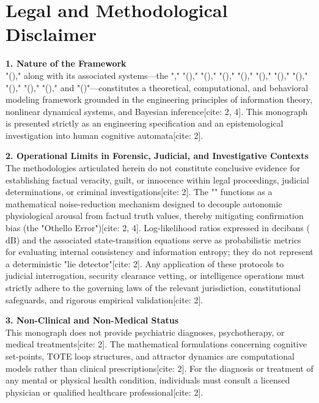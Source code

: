 \else
    \chapter*{Legal and Methodological Disclaimer}
    \noindent
    \textbf{1. Nature of the Framework}\\
    "\fullSNLP (\abbrSNLP)," along with its associated systems—the "\fullOthelloFilter," "\fullOIP (\abbrOIP)," "\fullBTP (\abbrBTP)," "\fullBV (\abbrBV)," "\fullBDLL (\abbrBDLL)," "\fullSBFT (\abbrSBFT)," "\fullTRPSH (\abbrTRPSH)," "\fullBHPPP (\abbrBHPPP)," "\fullUUSTT (\abbrUUSTT)," "\fullRCSMIT (\abbrRCSMIT)," "\fullFTHBFT (\abbrFTHBFT)," and "\fullMBCR (\abbrMBCR)"—constitutes a theoretical, computational, and behavioral modeling framework grounded in the engineering principles of information theory, nonlinear dynamical systems, and Bayesian inference[cite: 2, 4]. This monograph is presented strictly as an engineering specification and an epistemological investigation into human cognitive automata[cite: 2].

    \vspace{0.8em}
    \noindent
    \textbf{2. Operational Limits in Forensic, Judicial, and Investigative Contexts}\\
    The methodologies articulated herein do not constitute conclusive evidence for establishing factual veracity, guilt, or innocence within legal proceedings, judicial determinations, or criminal investigations[cite: 2]. The "\fullOthelloFilter" functions as a mathematical noise-reduction mechanism designed to decouple autonomic physiological arousal from factual truth values, thereby mitigating confirmation bias (the "Othello Error")[cite: 2, 4]. Log-likelihood ratios expressed in decibans ($\text{dB}$) and the associated state-transition equations serve as probabilistic metrics for evaluating internal consistency and information entropy; they do not represent a deterministic "lie detector"[cite: 2]. Any application of these protocols to judicial interrogation, security clearance vetting, or intelligence operations must strictly adhere to the governing laws of the relevant jurisdiction, constitutional safeguards, and rigorous empirical validation[cite: 2].

    \vspace{0.8em}
    \noindent
    \textbf{3. Non-Clinical and Non-Medical Status}\\
    This monograph does not provide psychiatric diagnoses, psychotherapy, or medical treatments[cite: 2]. The mathematical formulations concerning cognitive set-points, TOTE loop structures, and attractor dynamics are computational models rather than clinical prescriptions[cite: 2]. For the diagnosis or treatment of any mental or physical health condition, individuals must consult a licensed physician or qualified healthcare professional[cite: 2].

